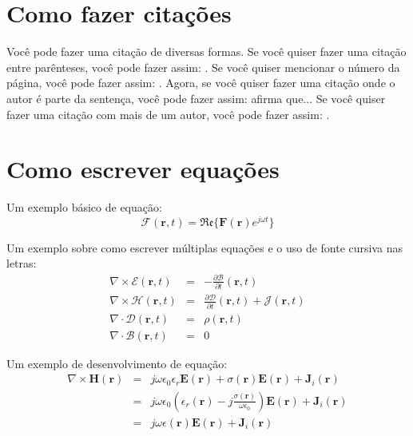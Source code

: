 
	\chapter{Como fazer citações}

		Você pode fazer uma citação de diversas formas. Se você quiser fazer uma citação entre parênteses, você pode fazer assim: \citep{milgram1969note}. Se você quiser mencionar o número da página, você pode fazer assim: \citep[p. 10]{deb2002fast}. Agora, se você quiser fazer uma citação onde o autor é parte da sentença, você pode fazer assim: \cite{maxwell1865viii} afirma que... Se você quiser fazer uma citação com mais de um autor, você pode fazer assim: \citep{van2019fantastic,maxwell1865viii}.
	
	\chapter{Como escrever equações}

		Um exemplo básico de equação:
		\begin{equation}
			\boldsymbol{\mathcal{F}}(\mathbf{r}, t) = \mathfrak{Re}\{\mathbf{F}(\mathbf{r})e^{j\omega t}\} \label{eq:2:fourier}
		\end{equation}

		Um exemplo sobre como escrever múltiplas equações e o uso de fonte cursiva nas letras:
		\begin{eqnarray}
			\nabla\times\boldsymbol{\mathcal{E}}(\mathbf{r}, t) &=& - \frac{\partial\boldsymbol{ \mathcal{B}}}{\partial t}(\mathbf{r}, t) \label{eq:2:maxwell:time:1} \\
			\nabla\times\boldsymbol{\mathcal{H}}(\mathbf{r}, t) &=& \frac{\partial\boldsymbol{ \mathcal{D}}}{\partial t}(\mathbf{r}, t) + \boldsymbol{\mathcal{J}}(\mathbf{r}, t) \label{eq:2:maxwell:time:2} \\
			\nabla\cdot\boldsymbol{\mathcal{D}}(\mathbf{r}, t) &=& \rho(\mathbf{r}, t) \label{eq:2:maxwell:time:3} \\
			\nabla\cdot\boldsymbol{\mathcal{B}}(\mathbf{r}, t) &=& 0 \label{eq:2:maxwell:time:4}
		\end{eqnarray}

		Um exemplo de desenvolvimento de equação:
		\begin{eqnarray}
			\nabla\times\mathbf{H}(\mathbf{r}) &=&  j\omega\epsilon_0\epsilon_r\mathbf{E}(\mathbf{r}) + \sigma(\mathbf{r})\mathbf{E}(\mathbf{r})+ \mathbf{J}_i(\mathbf{r}) \label{eq:2:complexmedia:1} \\
			 &=&  j\omega\epsilon_0\left(\epsilon_r(\mathbf{r}) -j\frac{\sigma(\mathbf{r})}{\omega\epsilon_0}\right)\mathbf{E}(\mathbf{r}) +  \mathbf{J}_i(\mathbf{r}) \label{eq:2:complexmedia:2} \\
			&=&  j\omega\epsilon(\mathbf{r})\mathbf{E}(\mathbf{r}) +  \mathbf{J}_i(\mathbf{r}) \label{eq:2:complexmedia:3}
		\end{eqnarray}

